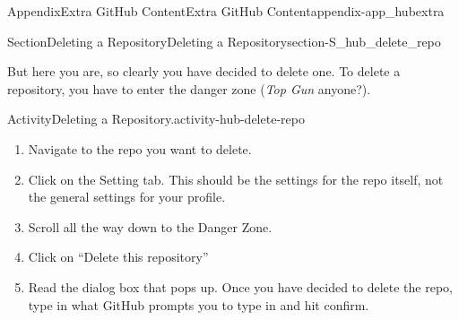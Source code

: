 \documentclass[oneside,10pt,]{book}
\newcommand{\pubtitle}[1]{\textsl{#1}}
\begin{document}
\begin{appendixptx}{Appendix}{Extra GitHub Content}{}{Extra GitHub Content}{}{}{appendix-app_hubextra}
\begin{sectionptx}{Section}{Deleting a Repository}{}{Deleting a Repository}{}{}{section-S_hub_delete_repo}
\par
But here you are, so clearly you have decided to delete one. To delete a repository, you have to enter the danger zone (\pubtitle{Top Gun} anyone?).%
\begin{activity}{Activity}{Deleting a Repository.}{activity-hub-delete-repo}%
\begin{enumerate}[font=\bfseries,label=(\alph*),ref=\alph*]%
\item{}Navigate to the repo you want to delete.%
\item{}Click on the Setting tab. This should be the settings for the repo itself, not the general settings for your profile.%
\item{}Scroll all the way down to the Danger Zone.%
\item{}Click on ``Delete this repository''%
\item{}Read the dialog box that pops up. Once you have decided to delete the repo, type in what GitHub prompts you to type in and hit confirm.%
\end{enumerate}%
\end{activity}%
\end{sectionptx}
\end{appendixptx}
%
%
\typeout{************************************************}
\typeout{************************************************}
%
\end{document}
